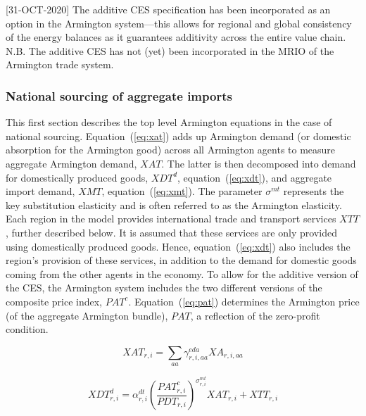 \documentclass[11pt,letterpaper]{report}
\begin{document}
[31-OCT-2020] The additive CES specification has been incorporated as an option
in the Armington system---this allows for regional and global consistency
of the energy balances as it guarantees additivity across the entire value
chain. N.B. The additive CES has not (yet) been incorporated in the MRIO
of the Armington trade system.

\subsubsection{National sourcing of aggregate imports}

This first section describes the top level Armington equations in the case of
national sourcing. Equation~(\ref{eq:xat}) adds up Armington demand (or domestic
absorption for the Armington good) across all Armington agents to measure
aggregate Armington demand, $\mathit{XAT}$. The latter is then decomposed into
demand for domestically produced goods, $\mathit{XDT}^d$,
equation~(\ref{eq:xdt}), and aggregate import demand, $\mathit{XMT}$,
equation~(\ref{eq:xmt}). The parameter $\sigma^{\mathit{mt}}$ represents the key
substitution elasticity and is often referred to as the Armington elasticity.
Each region in the model provides international trade and transport services
$\mathit{XTT}$, further described below. It is assumed that these services are
only provided using domestically produced goods. Hence, equation~(\ref{eq:xdt})
also includes the region's provision of these services, in addition to the
demand for domestic goods coming from the other agents in the economy.
To allow for the additive version of the CES, the Armington system
includes the two different versions of the composite price index, $\mathit{PAT}^c$.
Equation~(\ref{eq:pat}) determines the Armington price (of the aggregate
Armington bundle), $\mathit{PAT}$, a reflection of the zero-profit condition.

\begin{equation}
\label{eq:xat}
\mathit{XAT}_{r,i} =
   \sum_{\mathit{aa}} {
      \gamma^{\mathit{eda}}_{r,i,\mathit{aa}} \mathit{XA}_{r,i,\mathit{aa}}
   }
\end{equation}

\begin{equation}
\label{eq:xdt}
\mathit{XDT}^d_{r,i} =
   \alpha^{\mathit{dt}}_{r,i}
   \left( \frac {\mathit{PAT}^c_{r,i}} {\mathit{PDT}_{r,i}}
   \right)^{\sigma^{\mathit{mt}}_{r,\mathit{i}}}
   \mathit{XAT}_{r,i} + \mathit{XTT}_{r,i}
\end{equation}
\end{document}
